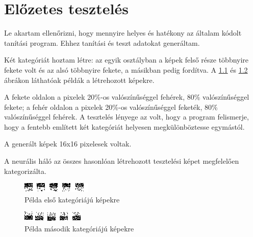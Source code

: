 \chapter{Előzetes tesztelés}\label{ch:easytest}

Le akartam ellenőrizni, hogy mennyire helyes és hatékony az általam kódolt tanítási program. Ehhez tanítási és teszt adatokat generáltam. 

Két kategóriát hoztam létre: az egyik osztályban a képek felső része többnyire fekete volt és az alsó többnyire fekete, a másikban pedig fordítva. A  \ref{fig:simple1} és \ref{fig:simple2} ábrákon láthatóak példák a létrehozott képekre.

A fekete oldalon a pixelek 20\%-os valószínűséggel fehérek, 80\% valószínűséggel fekete; a fehér oldalon a pixelek 20\%-os valószínűséggel feketék, 80\% valószínűséggel fehérek. A tesztelés lényege az volt, hogy a program felismerje, hogy a fentebb említett két kategóriát helyesen megkülönböztesse egymástól.

A generált képek 16x16 pixelesek voltak.

A neurális háló az összes hasonlóan létrehozott tesztelési képet megfelelően kategorizálta.

\begin{figure}[h]
\centering

\includegraphics[scale=2]{images/simpleTests1}
\caption{Példa első kategóriájú képekre}

\label{fig:simple1}
\end{figure}

\begin{figure}[h]
\centering

\includegraphics[scale=2]{images/simpleTests2}
\caption{Példa második kategóriájú képekre}

\label{fig:simple2}
\end{figure}
